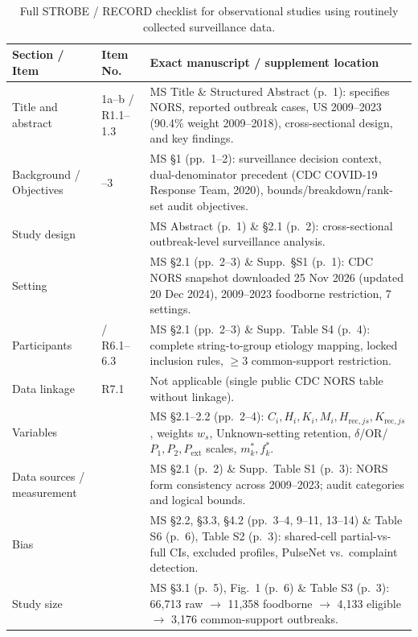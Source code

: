 \documentclass[11pt,a4paper]{article}
\begin{document}
\begin{table}[!htbp]
\centering
\scriptsize
\setlength{\tabcolsep}{3.5pt}
\renewcommand{\arraystretch}{1.12}
\caption{Full STROBE / RECORD checklist for observational studies using routinely collected surveillance data.}
\label{tab:record}
\begin{tabular}{>{\raggedright\arraybackslash}p{2.3cm} >{\raggedright\arraybackslash}p{1.5cm} >{\raggedright\arraybackslash}p{10.2cm}}
\toprule
Section / Item & Item No. & Exact manuscript / supplement location \\
\midrule
Title and abstract & 1a--b / R1.1--1.3 & MS Title \& Structured Abstract (p.\ 1): specifies NORS, reported outbreak cases, US 2009--2023 (90.4\% weight 2009--2018), cross-sectional design, and key findings. \\
Background / Objectives & 2--3 & MS §1 (pp.\ 1--2): surveillance decision context, dual-denominator precedent (CDC COVID-19 Response Team, 2020), bounds/breakdown/rank-set audit objectives. \\
Study design & 4 & MS Abstract (p.\ 1) \& §2.1 (p.\ 2): cross-sectional outbreak-level surveillance analysis. \\
Setting & 5 & MS §2.1 (pp.\ 2--3) \& Supp.\ §S1 (p.\ 1): CDC NORS snapshot downloaded 25 Nov 2026 (updated 20 Dec 2024), 2009--2023 foodborne restriction, 7 settings. \\
Participants & 6 / R6.1--6.3 & MS §2.1 (pp.\ 2--3) \& Supp.\ Table S4 (p.\ 4): complete string-to-group etiology mapping, locked inclusion rules, $\ge 3$ common-support restriction. \\
Data linkage & R7.1 & Not applicable (single public CDC NORS table without linkage). \\
Variables & 7 & MS §2.1--2.2 (pp.\ 2--4): $C_i, H_i, K_i, M_i, H_{\text{rec},js}, K_{\text{rec},js}$, weights $w_s$, Unknown-setting retention, $\delta$/OR/$P_1, P_2, P_{\mathrm{ext}}$ scales, $m^{*}_k, f^{*}_k$. \\
Data sources / measurement & 8 & MS §2.1 (p.\ 2) \& Supp.\ Table S1 (p.\ 3): NORS form consistency across 2009--2023; audit categories and logical bounds. \\
Bias & 9 & MS §2.2, §3.3, §4.2 (pp.\ 3--4, 9--11, 13--14) \& Table S6 (p.\ 6), Table S2 (p.\ 3): shared-cell partial-vs-full CIs, excluded profiles, PulseNet vs.\ complaint detection. \\
Study size & 10 & MS §3.1 (p.\ 5), Fig.\ 1 (p.\ 6) \& Table S3 (p.\ 3): 66,713 raw $\rightarrow$ 11,358 foodborne $\rightarrow$ 4,133 eligible $\rightarrow$ 3,176 common-support outbreaks. \\

\end{tabular}
\end{table}
\end{document}
